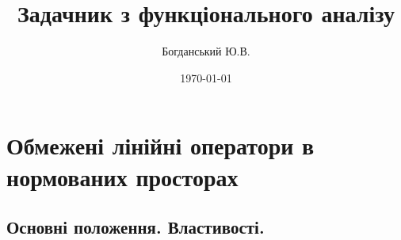 \documentclass{report}
\author{Богданський Ю.В.}
\title{Задачник з функціонального аналізу}
\date{\today}
\begin{document}
    \maketitle
    \tableofcontents
    \chapter{Обмежені лінійні оператори в нормованих просторах}
        \section{Основні положення. Властивості.}
            
\end{document}
